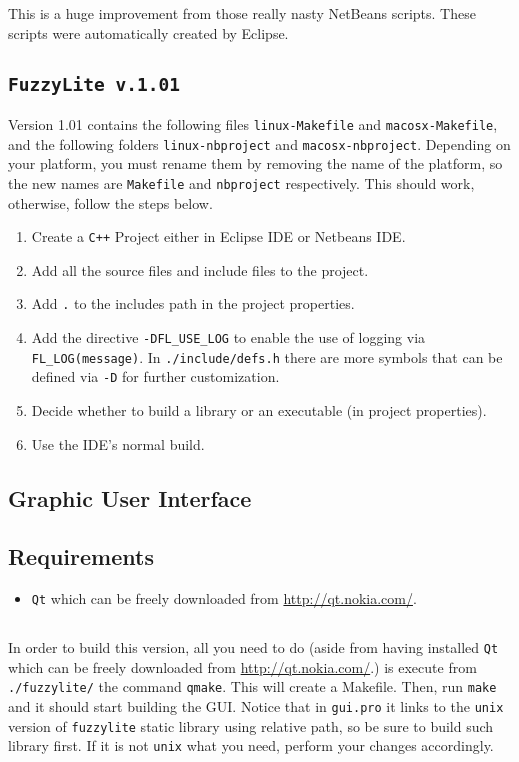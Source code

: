 	This is a huge improvement from those really nasty NetBeans scripts. These
	scripts were automatically created by Eclipse.

\subsection{\texttt{FuzzyLite v.1.01}}

	Version 1.01 contains the following files \texttt{linux-Makefile} and \texttt{macosx-Makefile}, and the following folders \texttt{linux-nbproject} and \texttt{macosx-nbproject}. Depending on your platform, you must rename them by removing the name of the platform, so the new names are \texttt{Makefile} and \texttt{nbproject} respectively. This should work, otherwise, follow the steps below.

	\begin{enumerate}
		\item Create a \texttt{C++} Project either in Eclipse IDE or Netbeans IDE.
		\item Add all the source files and include files to the project.
		\item Add \texttt{.} to the includes path in the project properties.
		\item Add the directive \texttt{-DFL\_USE\_LOG} to enable the use of logging via \texttt{FL\_LOG(message)}. In \texttt{./include/defs.h} there are more symbols that can be defined via \texttt{-D} for further customization.
		\item Decide whether to build a library or an executable (in project properties).
		\item Use the IDE's normal build.
	\end{enumerate}

\subsection{Graphic User Interface}
	\subsection{Requirements}
	\begin{itemize}
	  \item \texttt{Qt} which can be freely downloaded from
	  \url{http://qt.nokia.com/}.
	  
\end{itemize}
	\subsection{\fl}
	In order to build this version, all you need to do (aside from having
	installed \texttt{Qt} which can be freely downloaded from
\url{http://qt.nokia.com/}.) is execute from \texttt{./fuzzylite/} the command
\texttt{qmake}. This will create a Makefile. Then, run \texttt{make} and it
should start building the GUI. Notice that in \texttt{gui.pro} it links
 to the \texttt{unix} version of \texttt{fuzzylite} static library using
 relative path, so be sure to build such library first. If it is not
 \texttt{unix} what you need, perform your changes accordingly.

